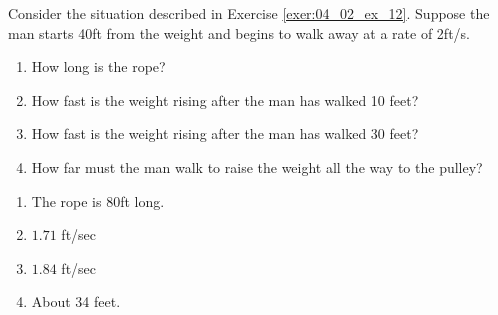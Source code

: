 {Consider the situation described in Exercise \ref{exer:04_02_ex_12}. Suppose the man starts 40ft from the weight and begins to walk away at a rate of 2ft/s. 
\begin{enumerate}
\item	How long is the rope?
\item	How fast is the weight rising after the man has walked 10 feet?
\item	How fast is the weight rising after the man has walked 30 feet?
\item	How far must the man walk to raise the weight all the way to the pulley?
\end{enumerate}
}
{
\begin{enumerate}
\item		The rope is 80ft long.
\item  $1.71$ ft/sec
\item	 $1.84$ ft/sec
\item		About 34 feet.
\end{enumerate}

}

